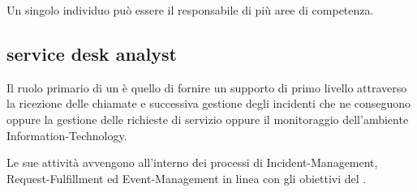 Un singolo individuo può essere il responsabile di più aree di competenza.

\subsection[Service Desk Analyst]{service desk analyst}
\label{sd-sd-analyst}
Il ruolo primario di un  è quello di fornire un supporto di primo livello attraverso la ricezione delle chiamate e successiva gestione degli incidenti che ne conseguono oppure la gestione delle richieste di servizio oppure il monitoraggio dell'ambiente \acs{Information-Technology}.

Le sue attività avvengono all'interno dei processi di \acf{Incident-Management}, \acf{Request-Fulfillment} ed \acf{Event-Management} in linea con gli obiettivi del .